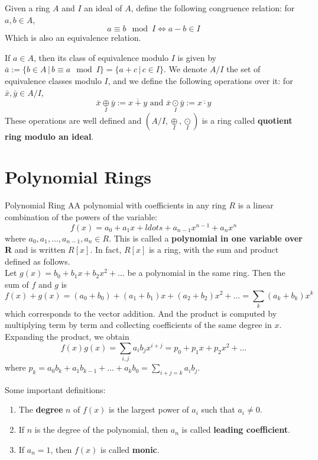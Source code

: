 \documentclass[12pt,a4paper]{article}
\begin{document}
Given a ring $A$ and $I$ an ideal of $A$, define the following congruence relation: for $a, b \in A$,
\[a \equiv b \mod I \iff a- b \in I  \]
Which is also an equivalence relation.

If $a \in A$, then its class of equivalence modulo $I$ is given by \(\bar{a} := \{ b \in A \, | \, b \equiv a \mod I \} = \{ a + c \, | \, c \in I \}\). We denote $A/I$ the set of equivalence classes modulo $I$, and we define the following operations over it: for $\bar{x}, \bar{y} \in A/I$, 
\[
\bar{x} \underset{I}{\oplus} \bar{y} := \overline{x+y} \text{ and } \bar{x} \underset{I}{\odot} \bar{y} := \overline{x\cdot y}
\]
These operations are well defined and $(A/I, \underset{I}{\oplus},  \underset{I}{\odot})$ is a ring called \textbf{quotient ring modulo an ideal}.

\section{Polynomial Rings}\label{polynomial-rings}

\begin{defn}{Polynomial Ring}
AA polynomial with coefficients in any ring $R$ is a linear combination of the powers of the variable:
\[
f(x) = a_0 + a_1 x + ldots + a_{n-1} x^{n-1} + a_n x^n
\]
where $a_0, a_1, \ldots, a_{n-1}, a_n \in R$. This is called a \textbf{polynomial in one variable over R} and is written $R[x]$. In fact, $R[x]$ is a ring, with the sum and product defined as follows. \\

Let $g(x) = b_0 + b_1 x + b_2 x^2 + \ldots$ be a polynomial in the same ring. Then the sum of $f$ and $g$ is 
\[
f(x) +  g(x) = (a_0 + b_0) + (a_1 + b_1)x + (a_2 + b_2)x^2 + \ldots = \sum_k (a_k + b_k)x^k
\]
which corresponds to the vector addition. And the product is computed by multiplying term by term and collecting coefficients of the same degree in $x$. Expanding the product, we obtain
\[
f(x)g(x) = \sum_{i,j} a_i b_j x^{i+j} = p_0 + p_1 x + p_2 x^2 + \ldots
\]
where $p_k = a_0 b_k + a_1 b_{k-1} + \ldots + a_k b_0 = \sum_{i+j=k} a_i b_j$.
\end{defn}

Some important definitions:
\begin{enumerate}
\item The \textbf{degree} $n$ of $f(x)$ is the largest power of $a_i$ such that $a_i \neq 0$.  
\item If $n$ is the degree of the polynomial, then $a_n$ is called \textbf{leading coefficient}. 
\item If $a_n = 1$, then $f(x)$ is called \textbf{monic}.
\end{enumerate}
\end{document}
